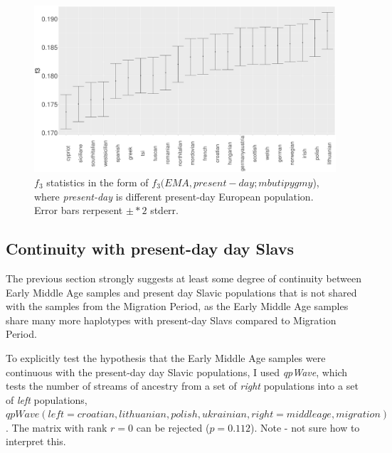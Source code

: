 \begin{figure}[htp]
    \centering
    \includegraphics[width=1.0\textwidth]{../images/chapter5/f3_HB_ancient_slavs.pdf}
    \caption{$f_{3}$ statistics in the form of $f_{3}(EMA, present-day;mbuti pygmy$), where \textit{present-day} is different present-day European population. Error bars rerpesent $\pm*2$ stderr.}
    \label{fig:f3_HB_ancient_slavs}
\end{figure}

\subsection{Continuity with present-day day Slavs}

The previous section strongly suggests at least some degree of continuity between Early Middle Age samples and present day Slavic populations that is not shared with the samples from the Migration Period, as the Early Middle Age samples share many more haplotypes with present-day Slavs compared to Migration Period. 

To explicitly test the hypothesis that the Early Middle Age samples were continuous with the present-day day Slavic populations, I used \textit{qpWave}, which tests the number of streams of ancestry from a set of \textit{right} populations into a set of \textit{left} populations, $qpWave(left=croatian,lithuanian,polish,ukrainian, right=middleage,migration)$. The matrix with rank $r=0$ can be rejected ($p=0.112$). Note - not sure how to interpret this. 

